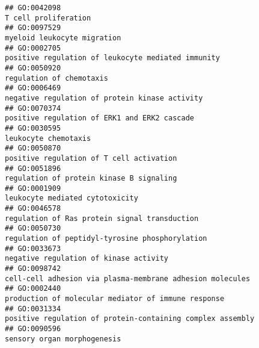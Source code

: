 \documentclass[
]{article}
\begin{document}
\begin{verbatim}
## GO:0042098                                                                                                                             T cell proliferation
## GO:0097529                                                                                                                      myeloid leukocyte migration
## GO:0002705                                                                                               positive regulation of leukocyte mediated immunity
## GO:0050920                                                                                                                         regulation of chemotaxis
## GO:0006469                                                                                                   negative regulation of protein kinase activity
## GO:0070374                                                                                                     positive regulation of ERK1 and ERK2 cascade
## GO:0030595                                                                                                                             leukocyte chemotaxis
## GO:0050870                                                                                                         positive regulation of T cell activation
## GO:0051896                                                                                                         regulation of protein kinase B signaling
## GO:0001909                                                                                                                  leukocyte mediated cytotoxicity
## GO:0046578                                                                                                    regulation of Ras protein signal transduction
## GO:0050730                                                                                                  regulation of peptidyl-tyrosine phosphorylation
## GO:0033673                                                                                                           negative regulation of kinase activity
## GO:0098742                                                                                        cell-cell adhesion via plasma-membrane adhesion molecules
## GO:0002440                                                                                              production of molecular mediator of immune response
## GO:0031334                                                                                       positive regulation of protein-containing complex assembly
## GO:0090596                                                                                                                      sensory organ morphogenesis

\end{verbatim}
\end{document}
